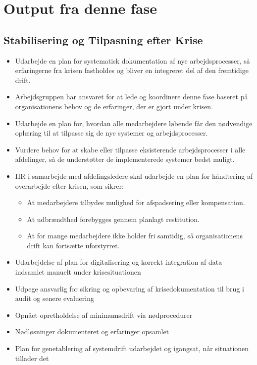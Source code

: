 \documentclass[a4paper,11pt,oneside]{book}
\def\tightlist{}
\begin{document}
\section{Output fra denne fase}\label{output-fra-denne-fase}

\subsection{Stabilisering og Tilpasning efter
Krise}\label{stabilisering-og-tilpasning-efter-krise}

\begin{itemize}
\item
  Udarbejde en plan for systematisk dokumentation af nye
  arbejdsprocesser, så erfaringerne fra krisen fastholdes og bliver en
  integreret del af den fremtidige drift.
\item
  Arbejdsgruppen har ansvaret for at lede og koordinere denne fase
  baseret på organisationens behov og de erfaringer, der er gjort under
  krisen.
\item
  Udarbejde en plan for, hvordan alle medarbejdere løbende får den
  nødvendige oplæring til at tilpasse sig de nye systemer og
  arbejdsprocesser.
\item
  Vurdere behov for at skabe eller tilpasse eksisterende
  arbejdsprocesser i alle afdelinger, så de understøtter de
  implementerede systemer bedst muligt.
\item
  HR i samarbejde med afdelingsledere skal udarbejde en plan for
  håndtering af overarbejde efter krisen, som sikrer:

  \begin{itemize}
  \tightlist
  \item
    At medarbejdere tilbydes mulighed for afspadsering eller
    kompensation.
  \item
    At udbrændthed forebygges gennem planlagt restitution.
  \item
    At for mange medarbejdere ikke holder fri samtidig, så
    organisationens drift kan fortsætte uforstyrret.
  \end{itemize}
\item
  Udarbejdelse af plan for digitalisering og korrekt integration af data
  indsamlet manuelt under krisesituationen
\item
  Udpege ansvarlig for sikring og opbevaring af krisedokumentation til
  brug i audit og senere evaluering
\item
  Opnået opretholdelse af minimumsdrift via nødprocedurer
\item
  Nødløsninger dokumenteret og erfaringer opsamlet
\item
  Plan for genetablering af systemdrift udarbejdet og igangsat, når
  situationen tillader det
\end{itemize}
\end{document}
